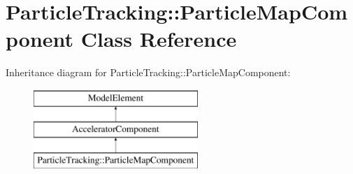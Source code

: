 \hypertarget{classParticleTracking_1_1ParticleMapComponent}{}\section{Particle\+Tracking\+:\+:Particle\+Map\+Component Class Reference}
\label{classParticleTracking_1_1ParticleMapComponent}
Inheritance diagram for Particle\+Tracking\+:\+:Particle\+Map\+Component\+:\begin{figure}[H]
\begin{center}
\leavevmode
\includegraphics[height=3.000000cm]{classParticleTracking_1_1ParticleMapComponent}
\end{center}
\end{figure}
